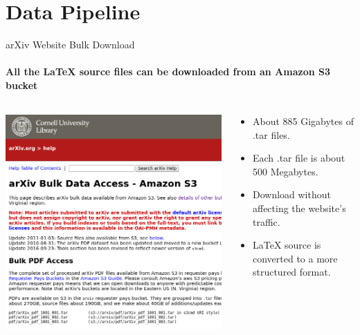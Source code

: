 \documentclass[10pt]{beamer}
\begin{document}
\section{Data Pipeline}
\begin{frame}{arXiv Website Bulk Download}
    \framesubtitle{All the \LaTeX{} source files can be downloaded from an Amazon S3 bucket}
    \begin{columns}[T]
        \begin{column}{0.5\textwidth}
    \includegraphics[width=\textwidth]{bulk_download.png} 
        \end{column}
        \begin{column}{0.6\textwidth}
            \begin{itemize}
                \item About 885 Gigabytes of .tar files.
                \item Each .tar file is about 500 Megabytes.
                \item Download without affecting the website's traffic.
                \item \LaTeX{} source is converted to a more structured format.
            \end{itemize}
        \end{column}
    \end{columns}
\end{frame}
\end{document}
